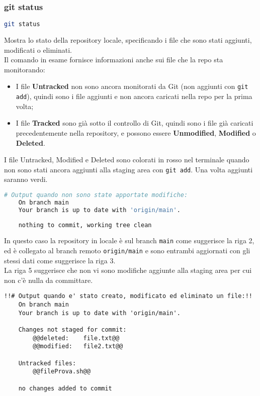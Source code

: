 \subsubsection{git status}
\begin{lstlisting}[language=bash]
	git status
\end{lstlisting}
Mostra lo stato della repository locale, specificando i file che sono stati aggiunti, modificati o eliminati.\\
Il comando in esame fornisce informazioni anche sui file che la repo sta monitorando:
\begin{itemize}[noitemsep, topsep=3pt]
	\item I file \textbf{Untracked} non sono ancora monitorati da Git (non aggiunti con \texttt{git add}), quindi sono i file aggiunti e non ancora caricati nella repo per la prima volta;
	\item I file \textbf{Tracked} sono già sotto il controllo di Git, quindi sono i file già caricati precedentemente nella repository, e possono essere \textbf{Unmodified}, \textbf{Modified} o \textbf{Deleted}.
\end{itemize}
I file Untracked, Modified e Deleted sono colorati in rosso nel terminale quando non sono stati ancora aggiunti alla staging area con \texttt{git add}. Una volta aggiunti saranno verdi.\\
\begin{lstlisting}[language=bash, backgroundcolor=\color{green!5}]
	# Output quando non sono state apportate modifiche:
	On branch main
	Your branch is up to date with 'origin/main'.
	
	nothing to commit, working tree clean
\end{lstlisting}
In questo caso la repository in locale è sul branch \texttt{main} come suggerisce la riga 2, ed è collegato al branch remoto \texttt{origin/main} e sono entrambi aggiornati con gli stessi dati come suggerisce la riga 3.\\
La riga 5 suggerisce che non vi sono modifiche aggiunte alla staging area per cui non c'è nulla da committare.
\begin{lstlisting}[backgroundcolor=\color{green!5}]
	!!# Output quando e' stato creato, modificato ed eliminato un file:!!
	On branch main
	Your branch is up to date with 'origin/main'.
	
	Changes not staged for commit:
		@@deleted:    file.txt@@
		@@modified:   file2.txt@@
	
	Untracked files:  
		@@fileProva.sh@@
	
	no changes added to commit
\end{lstlisting}


